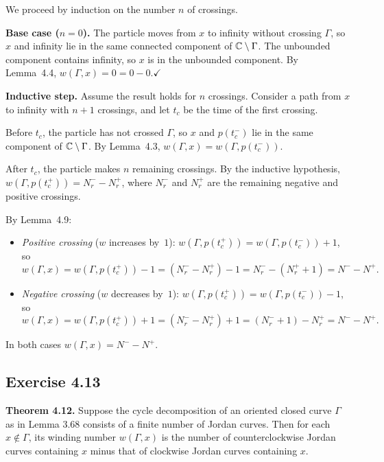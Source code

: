 \documentclass{article}
\begin{document}
\begin{solution}
  We proceed by induction on the number $n$ of crossings.

  \textbf{Base case ($n = 0$).}\;
  The particle moves from $x$ to infinity without crossing $\Gamma$,
  so $x$ and infinity lie in the same connected component of
  $\mathbb{C} \setminus \Gamma$.  The unbounded component contains infinity,
  so $x$ is in the unbounded component.  By Lemma~4.4,
  $w(\Gamma, x) = 0 = 0 - 0$.\quad$\checkmark$

  \textbf{Inductive step.}\;
  Assume the result holds for $n$ crossings.
  Consider a path from $x$ to infinity with $n + 1$ crossings,
  and let $t_c$ be the time of the first crossing.

  Before $t_c$, the particle has not crossed $\Gamma$, so $x$ and
  $p(t_c^-)$ lie in the same component of $\mathbb{C} \setminus \Gamma$.
  By Lemma~4.3, $w(\Gamma, x) = w(\Gamma, p(t_c^-))$.

  After $t_c$, the particle makes $n$ remaining crossings.
  By the inductive hypothesis,
  $w(\Gamma, p(t_c^+)) = N_r^- - N_r^+$,
  where $N_r^-$ and $N_r^+$ are the remaining negative and positive
  crossings.

  By Lemma~4.9:
  \begin{itemize}
    \item \textit{Positive crossing} ($w$ increases by~$1$):
      $w(\Gamma, p(t_c^+)) = w(\Gamma, p(t_c^-)) + 1$, so
      \[
        w(\Gamma, x) = w(\Gamma, p(t_c^+)) - 1
        = (N_r^- - N_r^+) - 1
        = N_r^- - (N_r^+ + 1)
        = N^- - N^+.
      \]
    \item \textit{Negative crossing} ($w$ decreases by~$1$):
      $w(\Gamma, p(t_c^+)) = w(\Gamma, p(t_c^-)) - 1$, so
      \[
        w(\Gamma, x) = w(\Gamma, p(t_c^+)) + 1
        = (N_r^- - N_r^+) + 1
        = (N_r^- + 1) - N_r^+
        = N^- - N^+.
      \]
  \end{itemize}
  In both cases $w(\Gamma, x) = N^- - N^+$.\qedhere
\end{solution}

\subsection{Exercise 4.13}

\textbf{Theorem 4.12.}
Suppose the cycle decomposition of an oriented closed curve $\Gamma$
as in Lemma 3.68 consists of a finite number of Jordan curves.
Then for each $x \notin \Gamma$, its winding number $w(\Gamma, x)$ is
the number of counterclockwise Jordan curves containing $x$ minus that
of clockwise Jordan curves containing $x$.
\end{document}
